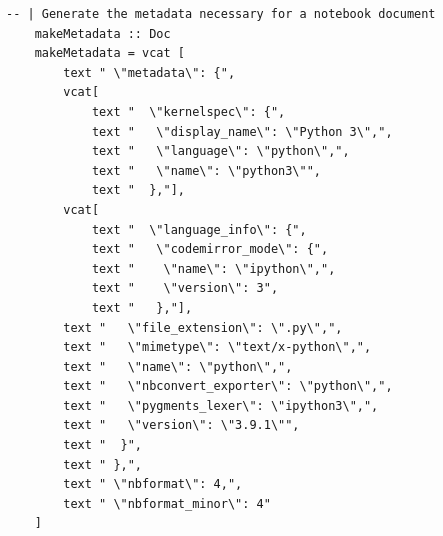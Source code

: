 \begin{lstlisting}[language=haskell1, 
	basicstyle=\linespread{1.1}\small\ttfamily]
	-- | Generate the metadata necessary for a notebook document
	makeMetadata :: Doc  
	makeMetadata = vcat [
		text " \"metadata\": {", 
		vcat[
			text "  \"kernelspec\": {", 
			text "   \"display_name\": \"Python 3\",", 
			text "   \"language\": \"python\",",
			text "   \"name\": \"python3\"", 
			text "  },"],
		vcat[
			text "  \"language_info\": {", 
			text "   \"codemirror_mode\": {", 
			text "    \"name\": \"ipython\",",
			text "    \"version\": 3",
			text "   },"],
		text "   \"file_extension\": \".py\",", 
		text "   \"mimetype\": \"text/x-python\",",
		text "   \"name\": \"python\",",
		text "   \"nbconvert_exporter\": \"python\",",
		text "   \"pygments_lexer\": \"ipython3\",",
		text "   \"version\": \"3.9.1\"",
		text "  }",
		text " },",
		text " \"nbformat\": 4,", 
		text " \"nbformat_minor\": 4" 
	]
\end{lstlisting}

\newpage

